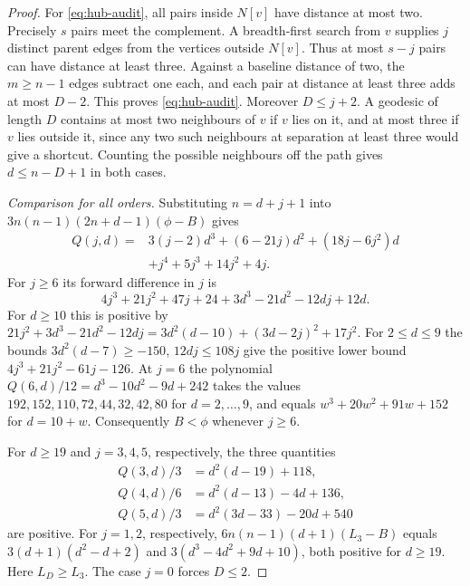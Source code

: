 \documentclass[11pt,a4paper]{article}
\theoremstyle{remark}\newtheorem*{remark}{Remark}
\begin{document}
\begin{proof}
For \eqref{eq:hub-audit}, all pairs inside $N[v]$ have distance at most two. Precisely $s$ pairs meet the complement. A breadth-first search from $v$ supplies $j$ distinct parent edges from the vertices outside $N[v]$. Thus at most $s-j$ pairs can have distance at least three. Against a baseline distance of two, the $m\ge n-1$ edges subtract one each, and each pair at distance at least three adds at most $D-2$. This proves \eqref{eq:hub-audit}. Moreover $D\le j+2$. A geodesic of length $D$ contains at most two neighbours of $v$ if $v$ lies on it, and at most three if $v$ lies outside it, since any two such neighbours at separation at least three would give a shortcut. Counting the possible neighbours off the path gives $d\le n-D+1$ in both cases.

\smallskip\noindent\emph{Comparison for all orders.}
Substituting $n=d+j+1$ into $3n(n-1)(2n+d-1)(\phi-B)$ gives
\begin{align*}
 Q(j,d)={}&3(j-2)d^3+(6-21j)d^2+(18j-6j^2)d\\
           &+j^4+5j^3+14j^2+4j.
\end{align*}
For $j\ge6$ its forward difference in $j$ is
\[
 4j^3+21j^2+47j+24+3d^3-21d^2-12dj+12d.
\]
For $d\ge10$ this is positive by
$21j^2+3d^3-21d^2-12dj=3d^2(d-10)+(3d-2j)^2+17j^2$.
For $2\le d\le9$ the bounds $3d^2(d-7)\ge-150$, $12dj\le108j$ give the positive lower bound $4j^3+21j^2-61j-126$. At $j=6$ the polynomial $Q(6,d)/12=d^3-10d^2-9d+242$ takes the values $192,152,110,72,44,32,42,80$ for $d=2,\ldots,9$, and equals $w^3+20w^2+91w+152$ for $d=10+w$. Consequently $B<\phi$ whenever $j\ge6$.

For $d\ge19$ and $j=3,4,5$, respectively, the three quantities
\begin{align*}
 Q(3,d)/3&=d^2(d-19)+118,\\
 Q(4,d)/6&=d^2(d-13)-4d+136,\\
 Q(5,d)/3&=d^2(3d-33)-20d+540
\end{align*}
are positive. For $j=1,2$, respectively, $6n(n-1)(d+1)(L_3-B)$ equals
$3(d+1)(d^2-d+2)$ and $3(d^3-4d^2+9d+10)$, both positive for $d\ge19$. Here $L_D\ge L_3$. The case $j=0$ forces $D\le2$.


\end{proof}
\end{document}
